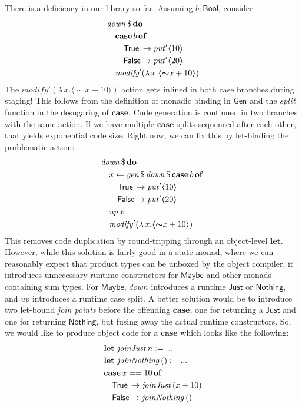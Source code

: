 \documentclass[acmsmall,screen,review,anonymous]{acmart}
\newcommand{\mit}[1]{\mathit{#1}}
\newcommand{\msf}[1]{\mathsf{#1}}
\newcommand{\mbf}[1]{\mathbf{#1}}
\newcommand{\bs}[1]{\boldsymbol{#1}}
\newcommand{\mdo}{\mbf{do}\,}
\newcommand{\ind}{\hspace{1em}}
\newcommand{\lam}{\lambda\,}
\newcommand{\of}{\mbf{of}\,}
\newcommand{\letdef}{\mbf{let\,}}
\newcommand{\Bool}{\msf{Bool}}
\newcommand{\fro}{\leftarrow}
\newcommand{\case}{\mbf{case\,}}
\newcommand{\spl}{{\bs{\sim}}}
\newcommand{\ql}{{\bs{\langle}}}
\newcommand{\qr}{{\bs{\rangle}}}
\newcommand{\True}{\msf{True}}
\newcommand{\False}{\msf{False}}
\newcommand{\Maybe}{\msf{Maybe}}
\newcommand{\Nothing}{\msf{Nothing}}
\newcommand{\Just}{\msf{Just}}
\theoremstyle{remark}
\newcommand{\mup}{\mit{up}}
\newcommand{\mdown}{\mit{down}}
\newcommand{\Gen}{\msf{Gen}}
\newcommand{\gen}{\mit{gen}}
\newcommand{\qt}[1]{\ql#1\qr}
\newcommand{\dlr}{\,\$\,}
\newcommand{\modify}{\mit{modify}}
\newcommand{\mput}{\mit{put}}
\begin{document}
There is a deficiency in our library so far. Assuming $b : \Bool$, consider:
\begin{alignat*}{3}
  & \mdown \dlr \mdo \\
  & \ind \case b\,\of\\
  & \ind \ind \True  \hspace{0.2em}\to \mput' \qt{10}\\
  & \ind \ind \False \to \mput' \qt{20}\\
  & \ind \modify' (\lam x. \qt{\spl x + 10})
\end{alignat*}
The $\modify' (\lam x. \qt{\spl x + 10})$ action gets inlined in both case
branches during staging! This follows from the definition of monadic binding in
$\Gen$ and the $\mit{split}$ function in the desugaring of $\mbf{case}$. Code
generation is continued in two branches with the same action. If we have
multiple $\mbf{case}$ splits sequenced after each other, that yields exponential
code size. Right now, we can fix this by let-binding the problematic action:
\begin{alignat*}{3}
  & \mdown \dlr \mdo \\
  & \ind x \fro \gen \dlr \mdown \dlr \case b\,\of\\
  & \ind \ind \True  \hspace{0.2em}\to \mput' \qt{10}\\
  & \ind \ind \False \to \mput' \qt{20}\\
  & \ind \mup\,x\\
  & \ind \modify' (\lam x. \qt{\spl x + 10})
\end{alignat*}
This removes code duplication by round-tripping through an object-level
$\mbf{let}$. However, while this solution is fairly good in a state monad, where
we can reasonably expect that product types can be unboxed by the object
compiler, it introduces unnecessary runtime constructors for $\Maybe$ and
other monads containing sum types. For $\Maybe$, $\mdown$ introduces a runtime
$\Just$ or $\Nothing$, and $\mup$ introduces a runtime case split. A better
solution would be to introduce two let-bound \emph{join points} before the
offending $\mbf{case}$, one for returning a $\Just$ and one for returning
$\Nothing$, but fusing away the actual runtime constructors. So, we would like
to produce object code for a $\mbf{case}$ which looks like the following:
\begin{alignat*}{3}
  & \letdef\,\mit{joinJust}\,n := ...\\
  & \letdef\,\mit{joinNothing}\,() := ...\\
  & \case x == 10\,\of\\
  & \ind \True \hspace{0.2em}\to \mit{joinJust}\,(x + 10) \\
  & \ind \False \to \mit{joinNothing}\,()
\end{alignat*}
\end{document}
